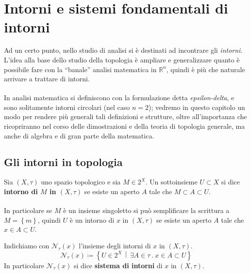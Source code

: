 \newpage
\section{Intorni e sistemi fondamentali di intorni}
Ad un certo punto, nello studio di analisi si è destinati ad incontrare gli \textit{intorni}. \\ L'idea alla base dello studio della topologia è ampliare e generalizzare quanto è possibile fare con la \enquote{banale} analisi matematica in $\mathbb{R}^n$, quindi è più che naturale arrivare a trattare di intorni. \\ \\ In analisi matematica si definiscono con la formulazione detta \textit{epsilon-delta}, e sono solitamente intorni circolari (nel caso $n=2$); vedremo in questo capitolo un modo per rendere più generali tali definizioni e strutture, oltre all'importanza che ricopriranno nel corso delle dimostrazioni e della teoria di topologia generale, ma anche di algebra e di gran parte della matematica.


\subsection{\textcolor{TopGener}{\textbf{Gli intorni in topologia}}}




\begin{definition}
	Sia $(X,\tau)$ uno spazio topologico e sia $M \in 2^X$. Un sottoinsieme $U \subset X$ si dice \textbf{intorno di $M$ in $(X,\tau)$} se esiste un aperto $A$ tale che $M \subset A \subset U$. \\ \\ In particolare se $M$ è un insieme singoletto si può semplificare la scrittura a $M = \left\{m\right\}$, quindi $U$ è un intorno di $x$ in $(X,\tau)$ se esiste un aperto $A$ tale che $x \in A \subset U$.
\end{definition}

\begin{definition}
	Indichiamo con $\mathcal{N}_\tau(x)$ l'insieme degli intorni di $x$ in $(X,\tau)$. 
	\begin{equation*}
		\mathcal{N}_\tau(x) \coloneqq \left\{ U \in 2^X \,\middle|\, \exists A \in \tau\ .\ x \in A \subset U \right\}
	\end{equation*}
	In particolare $\mathcal{N}_\tau(x)$ si dice \textbf{sistema di intorni} di $x$ in $(X, \tau)$.
\end{definition}

